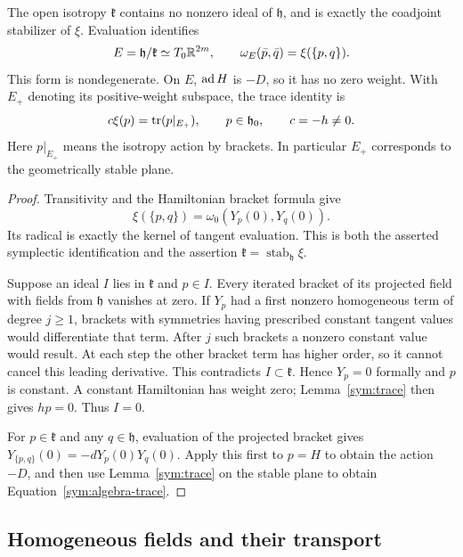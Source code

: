 \begin{proposition}
\label{sym:effective}
The open isotropy $\mathfrak k$ contains no nonzero ideal of
$\mathfrak h$, and is exactly the coadjoint stabilizer of $\xi$.
Evaluation identifies
\[
 E=\mathfrak h/\mathfrak k\simeq T_0\mathbb R^{2m},\qquad
 \omega_E(\bar p,\bar q)=\xi(\{p,q\}).
\]
This form is nondegenerate.  On $E$, $\operatorname{ad} H$ is $-D$, so it has no
zero weight.  With $E_+$ denoting its positive-weight subspace, the
trace identity is
\begin{equation}
 \label{sym:algebra-trace}
 c\xi(p)=\operatorname{tr}(p|_{E_+}),\qquad
 p\in\mathfrak h_0,\qquad c=-h\ne0.
\end{equation}
Here $p|_{E_+}$ means the isotropy action by brackets.  In particular
$E_+$ corresponds to the geometrically stable plane.
\end{proposition}

\begin{proof}
Transitivity and the Hamiltonian bracket formula give
\[
 \xi(\{p,q\})=\omega_0(Y_p(0),Y_q(0)).
\]
Its radical is exactly the kernel of tangent evaluation.  This is
both the asserted symplectic identification and the assertion
$\mathfrak k=\operatorname{stab}_{\mathfrak h}\xi$.

Suppose an ideal $I$ lies in $\mathfrak k$ and $p\in I$.  Every
iterated bracket of its projected field with fields from
$\mathfrak h$ vanishes at zero.  If $Y_p$ had a first nonzero
homogeneous term of degree $j\ge1$, brackets with symmetries having
prescribed constant tangent values would differentiate that term.
After $j$ such brackets a nonzero constant value would result.
At each step the other bracket term has higher order, so it cannot
cancel this leading derivative.  This contradicts $I\subset
\mathfrak k$.  Hence $Y_p=0$ formally and $p$ is constant.  A constant
Hamiltonian has weight zero; Lemma~\ref{sym:trace} then gives $hp=0$.
Thus $I=0$.

For $p\in\mathfrak k$ and any $q\in\mathfrak h$, evaluation of the
projected bracket gives
$Y_{\{p,q\}}(0)=-dY_p(0)Y_q(0)$.  Apply this first to $p=H$ to obtain
the action $-D$, and then use Lemma~\ref{sym:trace} on the stable
plane to obtain Equation~\eqref{sym:algebra-trace}.
\end{proof}

\subsection{Homogeneous fields and their transport}

